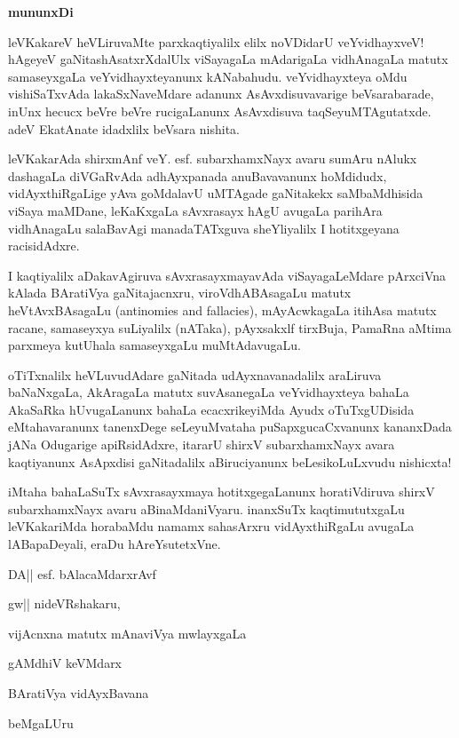 \begin{center}
\bf{\large{mununxDi}}
\end{center}

leVKakareV heVLiruvaMte parxkaqtiyalilx elilx noVDidarU veYvidhayxveV! hAgeyeV gaNitashAsatxrXdalUlx viSayagaLa mAdarigaLa vidhAnagaLa matutx samaseyxgaLa veYvidhayxteyanunx kANabahudu. veYvidhayxteya oMdu vishiSaTxvAda lakaSxNaveMdare adanunx AsAvxdisuvavarige beVsarabarade, inUnx hecucx beVre beVre rucigaLanunx AsAvxdisuva taqSeyuMTAgutatxde. adeV EkatAnate idadxlilx beVsara nishita.

leVKakarAda shirxmAnf veY. esf. subarxhamxNayx avaru sumAru nAlukx dashagaLa diVGaRvAda adhAyxpanada anuBavavanunx hoMdidudx, vidAyxthiRgaLige yAva goMdalavU uMTAgade gaNitakekx saMbaMdhisida viSaya maMDane, leKaKxgaLa sAvxrasayx hAgU avugaLa parihAra vidhAnagaLu salaBavAgi manadaTATxguva sheYliyalilx I hotitxgeyana racisidAdxre.

I kaqtiyalilx aDakavAgiruva sAvxrasayxmayavAda viSayagaLeMdare pArxciVna kAlada BAratiVya gaNitajacnxru, viroVdhABAsagaLu matutx heVtAvxBAsagaLu {\rm (antinomies and fallacies)}, mAyAcwkagaLa itihAsa matutx racane, samaseyxya suLiyalilx (nATaka), pAyxsakxlf tirxBuja, PamaRna aMtima parxmeya kutUhala samaseyxgaLu muMtAdavugaLu.

oTiTxnalilx heVLuvudAdare gaNitada udAyxnavanadalilx araLiruva baNaNxgaLa, AkAragaLa matutx suvAsanegaLa veYvidhayxteya bahaLa AkaSaRka hUvugaLanunx bahaLa ecacxrikeyiMda Ayudx oTuTxgUDisida eMtahavaranunx tanenxDege seLeyuMvataha puSapxgucaCxvanunx kananxDada jANa Odugarige apiRsidAdxre, itararU shirxV subarxhamxNayx avara kaqtiyanunx AsApxdisi gaNitadalilx aBiruciyanunx beLesikoLuLxvudu nishicxta! 

iMtaha bahaLaSuTx sAvxrasayxmaya hotitxgegaLanunx horatiVdiruva shirxV subarxhamxNayx avaru aBinaMdaniVyaru. inanxSuTx kaqtimututxgaLu leVKakariMda horabaMdu namamx sahasArxru vidAyxthiRgaLu avugaLa lABapaDeyali, eraDu hAreYsutetxVne.

\medskip

\hfill{DA|| esf. bAlacaMdarxrAvf}

gw|| nideVRshakaru,

vijAcnxna matutx mAnaviVya mwlayxgaLa

gAMdhiV keVMdarx

BAratiVya vidAyxBavana

beMgaLUru 
